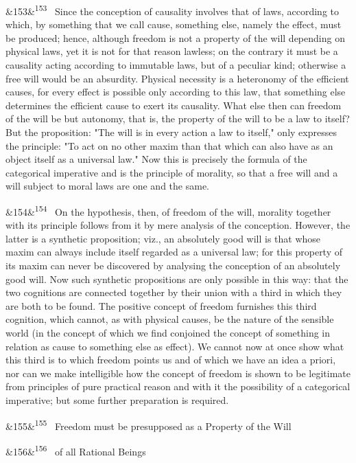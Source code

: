 \documentclass[12pt]{article}
\newcommand{\para}[1][]{\par\noindent\ifx&#1&\else\textsuperscript{\footnotesize #1}~\fi}
\begin{document}
\para[153] Since the conception of causality involves that of laws, according to which, by something that we call cause, something else, namely the effect, must be produced; hence, although freedom is not a property of the will depending on physical laws, yet it is not for that reason lawless; on the contrary it must be a causality acting according to immutable laws, but of a peculiar kind; otherwise a free will would be an absurdity. Physical necessity is a heteronomy of the efficient causes, for every effect is possible only according to this law, that something else determines the efficient cause to exert its causality. What else then can freedom of the will be but autonomy, that is, the property of the will to be a law to itself? But the proposition: "The will is in every action a law to itself," only expresses the principle: "To act on no other maxim than that which can also have as an object itself as a universal law." Now this is precisely the formula of the categorical imperative and is the principle of morality, so that a free will and a will subject to moral laws are one and the same.

\para[154] On the hypothesis, then, of freedom of the will, morality together with its principle follows from it by mere analysis of the conception. However, the latter is a synthetic proposition; viz., an absolutely good will is that whose maxim can always include itself regarded as a universal law; for this property of its maxim can never be discovered by analysing the conception of an absolutely good will. Now such synthetic propositions are only possible in this way: that the two cognitions are connected together by their union with a third in which they are both to be found. The positive concept of freedom furnishes this third cognition, which cannot, as with physical causes, be the nature of the sensible world (in the concept of which we find conjoined the concept of something in relation as cause to something else as effect). We cannot now at once show what this third is to which freedom points us and of which we have an idea a priori, nor can we make intelligible how the concept of freedom is shown to be legitimate from principles of pure practical reason and with it the possibility of a categorical imperative; but some further preparation is required.

\para[155] Freedom must be presupposed as a Property of the Will

\para[156] of all Rational Beings
\end{document}
